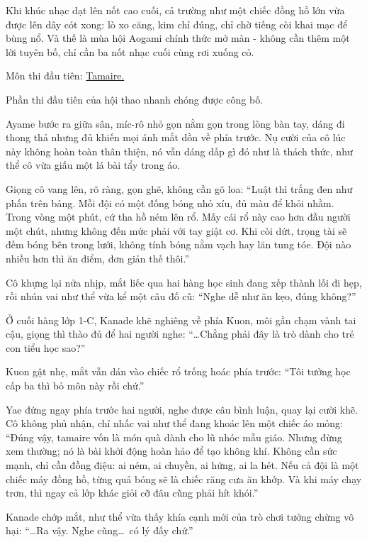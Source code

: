 \documentclass[../main.tex]{subfiles}
\begin{document}
Khi khúc nhạc dạt lên nốt cao cuối, cả trường như một chiếc đồng hồ lớn vừa được lên dây cót xong: lò xo căng, kim chỉ đúng, chỉ chờ tiếng còi khai mạc để bùng nổ.
Và thế là mùa hội Aogami chính thức mở màn - không cần thêm một lời tuyên bố, chỉ cần ba nốt nhạc cuối cùng rơi xuống cỏ.

\ct

\begin{center}
  {\color{vol} Môn thi đầu tiên: \uline{Tamaire.}}
\end{center}

Phần thi đầu tiên của hội thao nhanh chóng được công bố.

Ayame bước ra giữa sân, míc-rô nhỏ gọn nằm gọn trong lòng bàn tay, dáng đi thong thả nhưng đủ khiến mọi ánh mắt dồn về phía trước. Nụ cười của cô lúc này không hoàn toàn thân thiện, nó vẫn dáng dấp gì đó như là thách thức, như thể cô vừa giấu một lá bài tẩy trong áo.

Giọng cô vang lên, rõ ràng, gọn ghẽ, không cần gõ loa: ``Luật thì trắng đen như phấn trên bảng. Mỗi đội có một đống bóng nhỏ xíu, đủ màu để khỏi nhầm. Trong vòng một phút, cứ tha hồ ném lên rổ. Mấy cái rổ này cao hơn đầu người một chút, nhưng không đến mức phải với tay giật cơ. Khi còi dứt, trọng tài sẽ đếm bóng bên trong lưới, không tính bóng nằm vạch hay lăn tung tóe. Đội nào nhiều hơn thì ăn điểm, đơn giản thế thôi.''

Cô khựng lại nửa nhịp, mắt liếc qua hai hàng học sinh đang xếp thành lối đi hẹp, rồi nhún vai như thể vừa kể một câu đố cũ: ``Nghe dễ như ăn kẹo, đúng không?''

Ở cuối hàng lớp 1-C, Kanade khẽ nghiêng về phía Kuon, môi gần chạm vành tai cậu, giọng thì thào đủ để hai người nghe: ``\dots Chẳng phải đây là trò dành cho trẻ con tiểu học sao?''

Kuon gật nhẹ, mắt vẫn dán vào chiếc rổ trống hoác phía trước: ``Tôi tưởng học cấp ba thì bỏ môn này rồi chứ.''

Yae đứng ngay phía trước hai người, nghe được câu bình luận, quay lại cười khẽ. Cô không phủ nhận, chỉ nhấc vai như thể đang khoác lên một chiếc áo mỏng: ``Đúng vậy, tamaire vốn là món quà dành cho lũ nhóc mẫu giáo. Nhưng đừng xem thường; nó là bài khởi động hoàn hảo để tạo không khí. Không cần sức mạnh, chỉ cần đồng điệu: ai ném, ai chuyền, ai hứng, ai la hét. Nếu cả đội là một chiếc máy đồng hồ, từng quả bóng sẽ là chiếc răng cưa ăn khớp. Và khi máy chạy trơn, thì ngay cả lớp khác giỏi cỡ đâu cũng phải hít khói.''

Kanade chớp mắt, như thể vừa thấy khía cạnh mới của trò chơi tưởng chừng vô hại: ``\dots Ra vậy. Nghe cũng\dots\ có lý đấy chứ.''
\end{document}
